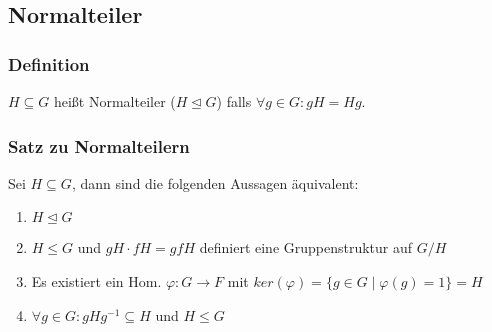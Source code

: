 \documentclass[12pt, german]{article}
\begin{document}
\subsection{Normalteiler}		
\subsubsection{Definition}
	$H \subseteq G$ heißt Normalteiler ($H\trianglelefteq G$) falls $\forall g \in G : gH = Hg$. 

\subsubsection{Satz zu Normalteilern}
	Sei $H \subseteq G$, dann sind die folgenden Aussagen äquivalent: 
	\begin{enumerate}[label=\arabic*)]
		\item $H\trianglelefteq G$
		\item $H \leq G$ und $gH \cdot fH = gfH$ definiert eine Gruppenstruktur auf $G/H$
		\item Es existiert ein Hom. $\varphi: G \to F$ mit $ker(\varphi) = \{g \in G \mid \varphi(g)= 1\} = H$
		\item $\forall g \in G : gHg^{-1} \subseteq H$ und $H \leq G$
	\end{enumerate}
\end{document}
